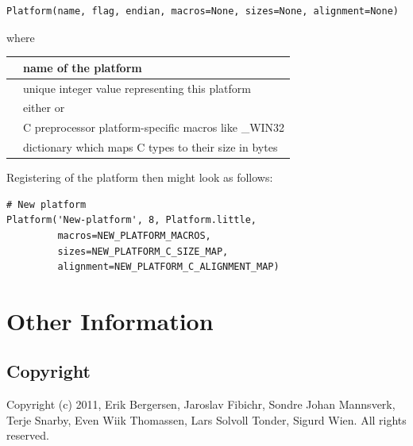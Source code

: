 \documentclass[A4paper,10pt,english]{sphinxmanual}
\begin{document}
\begin{description}
\begin{Verbatim}[commandchars=\\\{\}]
Platform(name, flag, endian, macros=None, sizes=None, alignment=None)
\end{Verbatim}

where

\begin{tabulary}{\linewidth}{|L|L|}
\hline

 & 
name of the platform
\\\hline

 & 
unique integer value representing this platform
\\\hline

 & 
either  or 
\\\hline

 & 
C preprocessor platform-specific macros like \_WIN32
\\\hline

 & 
dictionary which maps C types to their size in bytes
\\\hline
\end{tabulary}


Registering of the platform then might look as follows:

\begin{Verbatim}[commandchars=\\\{\}]
# New platform
Platform('New-platform', 8, Platform.little,
         macros=NEW_PLATFORM_MACROS,
         sizes=NEW_PLATFORM_C_SIZE_MAP,
         alignment=NEW_PLATFORM_C_ALIGNMENT_MAP)
\end{Verbatim}

\end{description}


\section{Other Information}
\label{index:yaml}\label{index:other-information}

\subsection{Copyright}
\label{other/license::doc}\label{other/license:copyright}
Copyright (c) 2011, Erik Bergersen, Jaroslav Fibichr, Sondre Johan Mannsverk, Terje Snarby, Even Wiik Thomassen, Lars Solvoll Tonder, Sigurd Wien. All rights reserved.
\end{document}
